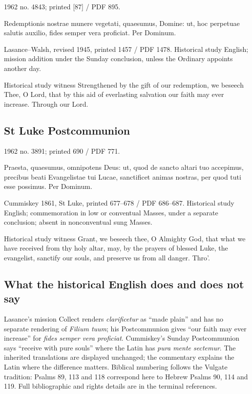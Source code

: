 1962 no. 4843; printed [87] / PDF 895.

\begin{latinproper}
Redemptionis nostrae munere vegetati, quaesumus, Domine: ut, hoc perpetuae salutis auxilio, fides semper vera proficiat. Per Dominum.
\end{latinproper}

Lasance–Walsh, revised 1945, printed 1457 / PDF 1478. Historical study English; mission addition under the Sunday conclusion, unless the Ordinary appoints another day.

\begin{englishwitness}{Historical study witness}
Strengthened by the gift of our redemption, we beseech Thee, O Lord, that by this aid of everlasting salvation our faith may ever increase. Through our Lord.


\end{englishwitness}

\subsection{St Luke Postcommunion}
\label{proper-luke-postcommunion}

1962 no. 3891; printed 690 / PDF 771.

\begin{latinproper}
Praesta, quaesumus, omnipotens Deus: ut, quod de sancto altari tuo accepimus, precibus beati Evangelistae tui Lucae, sanctificet animas nostras, per quod tuti esse possimus. Per Dominum.
\end{latinproper}

Cummiskey 1861, St Luke, printed 677–678 / PDF 686–687. Historical study English; commemoration in low or conventual Masses, under a separate conclusion; absent in nonconventual sung Masses.

\begin{englishwitness}{Historical study witness}
Grant, we beseech thee, O Almighty God, that what we have received from thy holy altar, may, by the prayers of blessed Luke, the evangelist, sanctify our souls, and preserve us from all danger. Thro’.


\end{englishwitness}

\subsection{What the historical English does and does not say}
Lasance's mission Collect renders \emph{clarificetur} as ``made plain'' and has no separate rendering of \emph{Filium tuum}; his Postcommunion gives ``our faith may ever increase'' for \emph{fides semper vera proficiat}. Cummiskey's Sunday Postcommunion says ``receive with pure souls'' where the Latin has \emph{pura mente sectemur}. The inherited translations are displayed unchanged; the commentary explains the Latin where the difference matters. Biblical numbering follows the Vulgate tradition: Psalms 89, 113 and 118 correspond here to Hebrew Psalms 90, 114 and 119. Full bibliographic and rights details are in the terminal references.
